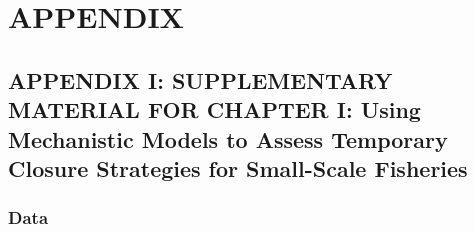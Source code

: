 \documentclass[
  12pt,
]{article}
\begin{document}
\newpage

\hypertarget{appendix}{%
\section{APPENDIX}\label{appendix}}

\hypertarget{appendix-i-supplementary-material-for-chapter-i-using-mechanistic-models-to-assess-temporary-closure-strategies-for-small-scale-fisheries}{%
\subsection{APPENDIX I: SUPPLEMENTARY MATERIAL FOR CHAPTER I: Using Mechanistic Models to Assess Temporary Closure Strategies for Small-Scale Fisheries}\label{appendix-i-supplementary-material-for-chapter-i-using-mechanistic-models-to-assess-temporary-closure-strategies-for-small-scale-fisheries}}

\hypertarget{data-1}{%
\subsubsection{Data}\label{data-1}}



\begin{table}[!h]

\caption{\label{tab:RabData}Data collected in Raberinary \& Benbow (2012). Data were extracted from Figure 7 of this paper using WebPlotDigitizer (\url{https://automeris.io/WebPlotDigitizer/}) and were used to parameterize the matrix model. \label{RabData}}
\centering
{}
\end{table}
\end{document}
